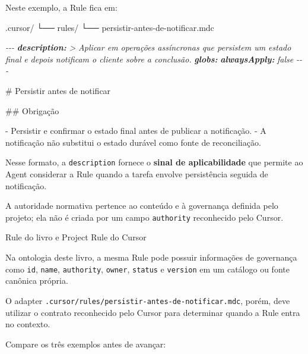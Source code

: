 \documentclass[
  10pt,
  a4paper,
  oneside]{book}
\newenvironment{Shaded}{}{}
\newcommand{\AnnotationTok}[1]{\textcolor[rgb]{0.38,0.63,0.69}{\textbf{\textit{#1}}}}
\newcommand{\CommentTok}[1]{\textcolor[rgb]{0.38,0.63,0.69}{\textit{#1}}}
\newcommand{\FunctionTok}[1]{\textcolor[rgb]{0.02,0.16,0.49}{#1}}
\newcommand{\NormalTok}[1]{#1}
\newcommand{\SpecialStringTok}[1]{\textcolor[rgb]{0.73,0.40,0.53}{#1}}
\renewenvironment{Shaded}{\begin{snugshade}}{\end{snugshade}}%
\begin{document}
Neste exemplo, a Rule fica em:

\begin{Shaded}
\begin{Highlighting}[]
\NormalTok{.cursor/}
\NormalTok{└── rules/}
\NormalTok{    └── persistir{-}antes{-}de{-}notificar.mdc}
\end{Highlighting}
\end{Shaded}

\begin{Shaded}
\begin{Highlighting}[]
\CommentTok{{-}{-}{-}}
\AnnotationTok{description:}\CommentTok{ \textgreater{}}
\CommentTok{  Aplicar em operações assíncronas que persistem um estado final}
\CommentTok{  e depois notificam o cliente sobre a conclusão.}
\AnnotationTok{globs:}
\AnnotationTok{alwaysApply:}\CommentTok{ false}
\CommentTok{{-}{-}{-}}

\FunctionTok{\# Persistir antes de notificar}

\FunctionTok{\#\# Obrigação}

\SpecialStringTok{{-} }\NormalTok{Persistir e confirmar o estado final antes de publicar a notificação.}
\SpecialStringTok{{-} }\NormalTok{A notificação não substitui o estado durável como fonte de reconciliação.}
\end{Highlighting}
\end{Shaded}

Nesse formato, a \texttt{description} fornece o \textbf{sinal de
aplicabilidade} que permite ao Agent considerar a Rule quando a tarefa
envolve persistência seguida de notificação.

A autoridade normativa pertence ao conteúdo e à governança definida pelo
projeto; ela não é criada por um campo \texttt{authority} reconhecido
pelo Cursor.

\begin{infobox}{Rule do livro e Project Rule do Cursor}

Na ontologia deste livro, a mesma Rule pode possuir informações de
governança como \texttt{id}, \texttt{name}, \texttt{authority},
\texttt{owner}, \texttt{status} e \texttt{version} em um catálogo ou
fonte canônica própria.

O adapter \texttt{.cursor/rules/persistir-antes-de-notificar.mdc},
porém, deve utilizar o contrato reconhecido pelo Cursor para determinar
quando a Rule entra no contexto.

\end{infobox}

Compare os três exemplos antes de avançar:
\end{document}
